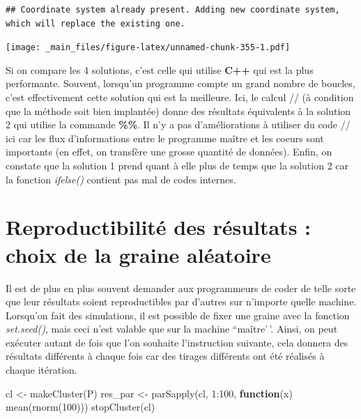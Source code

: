 \documentclass[
]{book}
\newenvironment{Shaded}{\begin{snugshade}}{\end{snugshade}}
\newcommand{\ControlFlowTok}[1]{\textcolor[rgb]{0.13,0.29,0.53}{\textbf{#1}}}
\newcommand{\DecValTok}[1]{\textcolor[rgb]{0.00,0.00,0.81}{#1}}
\newcommand{\FunctionTok}[1]{\textcolor[rgb]{0.00,0.00,0.00}{#1}}
\newcommand{\NormalTok}[1]{#1}
\newcommand{\OtherTok}[1]{\textcolor[rgb]{0.56,0.35,0.01}{#1}}
\newcommand{\SpecialCharTok}[1]{\textcolor[rgb]{0.00,0.00,0.00}{#1}}
\theoremstyle{definition}
\theoremstyle{definition}
\theoremstyle{definition}
\theoremstyle{definition}
\theoremstyle{remark}
\begin{document}
\begin{verbatim}
## Coordinate system already present. Adding new coordinate system, which will replace the existing one.
\end{verbatim}

\texttt{[image: \_main\_files/figure-latex/unnamed-chunk-355-1.pdf]}

Si on compare les 4 solutions, c'est celle qui utilise \textbf{C++} qui est la plus performante. Souvent, lorsqu'un programme compte un grand nombre de boucles, c'est effectivement cette solution qui est la meilleure. Ici, le calcul // (à condition que la méthode soit bien implantée) donne des résultats équivalents à la solution 2 qui utilise la commande \textbf{\%\%}. Il n'y a pas d'améliorations à utiliser du code // ici car les flux d'informations entre le programme maître et les coeurs sont importants (en effet, on transfère une grosse quantité de données). Enfin, on constate que la solution 1 prend quant à elle plus de temps que la solution 2 car la fonction \emph{ifelse()} contient pas mal de codes internes.

\hypertarget{reproductibilituxe9-des-ruxe9sultats-choix-de-la-graine-aluxe9atoire}{%
\section{Reproductibilité des résultats : choix de la graine aléatoire}\label{reproductibilituxe9-des-ruxe9sultats-choix-de-la-graine-aluxe9atoire}}

Il est de plus en plus souvent demander aux programmeurs de coder de telle sorte que leur résultats soient reproductibles par d'autres sur n'importe quelle machine. Lorsqu'on fait des simulations, il est possible de fixer une graine avec la fonction \emph{set.seed()}, mais ceci n'est valable que sur la machine ``maître'\,'. Ainsi, on peut exécuter autant de fois que l'on souhaite l'instruction suivante, cela donnera des résultats différents à chaque fois car des tirages différents ont été réalisés à chaque itération.

\begin{Shaded}
\begin{Highlighting}[]
\NormalTok{cl }\OtherTok{\textless{}{-}} \FunctionTok{makeCluster}\NormalTok{(P) }
\NormalTok{res\_par }\OtherTok{\textless{}{-}} \FunctionTok{parSapply}\NormalTok{(cl, }\DecValTok{1}\SpecialCharTok{:}\DecValTok{100}\NormalTok{, }\ControlFlowTok{function}\NormalTok{(x) }\FunctionTok{mean}\NormalTok{(}\FunctionTok{rnorm}\NormalTok{(}\DecValTok{100}\NormalTok{)))}
\FunctionTok{stopCluster}\NormalTok{(cl) }
\end{Highlighting}
\end{Shaded}
\end{document}
